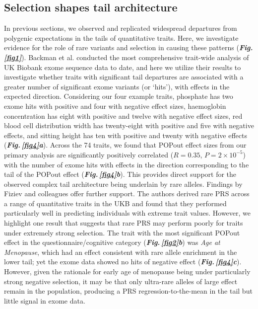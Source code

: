 \documentclass[12pt]{zHenriquesLab-StyleBioRxiv}
\newcommand\fref[1]{\normalsize{\textbf{\textit{Fig.\,\ref{#1}}}}\normalsize{}}
\newcommand\dref[2]{\normalsize{\textbf{\textit{Fig.\,\ref{#1}#2}}}\normalsize{}}
\begin{document}
\subsection*{Selection shapes tail architecture}
In previous sections, we observed and replicated widespread 
departures from polygenic expectations in the tails of quantitative 
traits. Here, we investigate evidence for the role of rare variants 
and selection in causing these patterns 
(\fref{fig1}). Backman et al. \cite{Backman2021} conducted 
the most comprehensive trait-wide analysis of UK Biobank 
exome sequence data to date, and here we utilize their 
results to investigate whether traits with significant tail 
departures are associated with a greater number of significant 
exome variants (or ‘hits’), with effects in the expected 
direction. Considering our four example traits, phosphate has
two exome hits with positive and four with negative 
effect sizes, haemoglobin concentration has eight with 
positive and twelve with negative effect sizes, red blood 
cell distribution width has twenty-eight with positive and 
five with negative effects, and sitting height has ten with 
positive and twenty with negative effects (\dref{fig4}{a}). 
Across the 74 traits, we found that POPout effect sizes from 
our primary analysis are significantly positively 
correlated ($R=0.35$, $P=2\times10^{-5}$) with the 
number of exome hits with effects in the direction 
corresponding to the tail of the POPout 
effect (\dref{fig4}{b}). This provides direct 
support for the observed complex tail architecture 
being underlain by rare alleles. Findings by Fiziev and 
colleagues \cite{Fiziev2023} offer further support. 
The authors derived rare PRS across a range of quantitative 
traits in the UKB and found that they performed particularly well in 
predicting individuals with extreme trait values. 
However, we highlight one result that suggests that rare 
PRS may perform poorly for traits under extremely strong 
selection. The trait with the most significant POPout 
effect in the questionnaire/cognitive category 
(\dref{fig2}{b}) was \textit{Age at Menopause}, 
which had an effect consistent with rare allele 
enrichment in the lower tail; yet the exome data showed 
no hits of negative effect (\dref{fig4}{c}). However, 
given the rationale for early age of menopause being 
under particularly strong negative selection, it may 
be that only ultra-rare alleles of large effect 
remain in the population, producing a PRS regression-to-the-mean 
in the tail but little signal in exome data.
%
%
%
\end{document}
